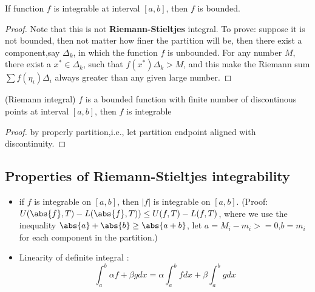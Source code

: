 \begin{refsection}
\begin{lemma}\cite{mathanalysischinese} If function $f$ is integrable at interval $[a,b]$, then $f$ is bounded.
\end{lemma}
\begin{proof}
Note that this is not \textbf{Riemann-Stieltjes} integral. To prove: suppose it is not bounded, then not matter how finer the partition will be, then there exist a component,say $\Delta_k$, in which the function $f$ is unbounded. For any number $M$, there exist a $x^*\in \Delta_k$, such that $f(x^*)\Delta_k > M$, and this make the Riemann sum $\sum f(\eta_i)\Delta_i$ always greater than any given large number.	
\end{proof}


\begin{lemma}
(Riemann integral)
$f$ is a bounded function with finite number of discontinous points at interval $[a,b]$, then $f$ is integrable
\end{lemma}
\begin{proof}
	by properly partition,i.e., let partition endpoint aligned with discontinuity. 
\end{proof}




\subsection{Properties of Riemann-Stieltjes integrability}
\begin{itemize}
    \item if $f$ is integrable on $[a,b]$, then $|f|$ is integrable on $[a,b]$.\cite{mathanalysischinese}\cite{johnsonbaugh2010foundations} (Proof: $U(\abs{f},T)-L(\abs{f},T)) \leq U(f,T)-L(f,T)$, where we use the inequality $\abs{a}+\abs{b} \geq \abs{a+b}$, let $a=M_i-m_i>=0$,$b=m_i$ for each component in the partition.)
    
    \item Linearity of definite integral \cite{mathanalysischinese}\cite{johnsonbaugh2010foundations}:
    $$\int_a^b \alpha f + \beta g dx = \alpha \int_a^b f dx+ \beta \int_a^b g dx$$
\end{itemize}






\end{refsection}
